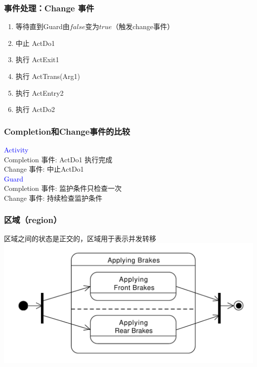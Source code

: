 \documentclass[compress]{beamer}
\begin{document}
\begin{frame}
  \frametitle{事件处理：Change 事件}
\noindent  \resizebox{1.0\hsize}{!} {
}

\begin{enumerate}
  \item 等待直到Guard由$false$变为$true$（触发change事件）
  \item 中止 ActDo1
  \item 执行 ActExit1
  \item 执行 ActTrans(Arg1)
  \item 执行 ActEntry2
  \item 执行 ActDo2
\end{enumerate}
\end{frame}

\begin{frame}
  \frametitle{Completion和Change事件的比较}
  \textcolor{blue}{Activity} \\
  Completion 事件:  ActDo1 执行完成  \\
  Change 事件: 中止ActDo1 \\[2ex]
  \textcolor{blue}{Guard} \\
  Completion 事件: 监护条件只检查一次  \\
  Change 事件: 持续检查监护条件

\end{frame}

\begin{frame}
  \frametitle{区域（region）}
  区域之间的状态是正交的，区域用于表示并发转移 \\[3ex]
  \centering\includegraphics[width=1.0\hsize]{complexstate1.pdf}
\end{frame}
\end{document}

